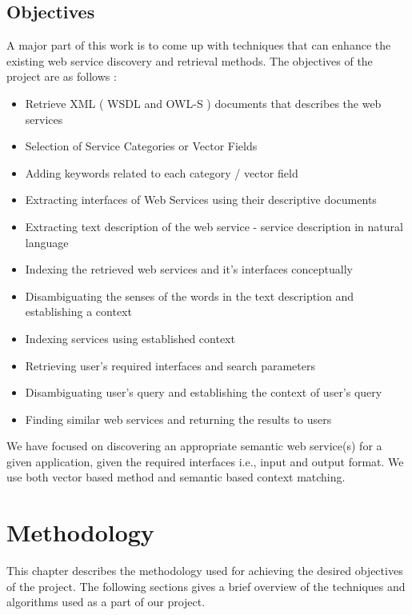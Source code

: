 \documentclass[12pt, oneside]{book}
\begin{document}
\section{Objectives}
A major part of this work is to come up with techniques that can enhance the existing web service discovery and retrieval methods. The objectives of the project are as follows :
\begin{itemize}
 \item Retrieve XML ( WSDL and OWL-S ) documents that describes the web services
 \item Selection of Service Categories or Vector Fields
 \item Adding keywords related to each category / vector field
 \item Extracting interfaces of Web Services using their descriptive documents
 \item Extracting text description of the web service - service description in natural language
 \item Indexing the retrieved web services and it's interfaces conceptually
 \item Disambiguating the senses of the words in the text description and establishing a context
 \item Indexing services using established context
 \item Retrieving user's required interfaces and search parameters
 \item Disambiguating user's query and establishing the context of user's query
 \item Finding similar web services and returning the results to users
\end{itemize}
We have focused on discovering an appropriate semantic web service(s) for a given application, given the required interfaces i.e., input and output format. We use both vector based method and semantic based context matching. \\

\chapter{Methodology}
This chapter describes the methodology used for achieving the desired objectives of the project. The following sections gives a brief overview of the techniques and algorithms used as a part of our project.
\end{document}
